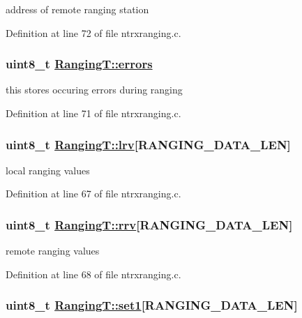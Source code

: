 address of remote ranging station 

Definition at line 72 of file ntrxranging.c.\hypertarget{structRangingT_215921081ad3adb2e4eaf6ee121e1015}{
\subsubsection[errors]{\setlength{\rightskip}{0pt plus 5cm}uint8\_\-t \hyperlink{structRangingT_215921081ad3adb2e4eaf6ee121e1015}{Ranging\-T::errors}}}
\label{structRangingT_215921081ad3adb2e4eaf6ee121e1015}


this stores occuring errors during ranging 

Definition at line 71 of file ntrxranging.c.\hypertarget{structRangingT_2709b7cecea01e61e4a1664b8b639fc3}{
\subsubsection[lrv]{\setlength{\rightskip}{0pt plus 5cm}uint8\_\-t \hyperlink{structRangingT_2709b7cecea01e61e4a1664b8b639fc3}{Ranging\-T::lrv}\mbox{[}RANGING\_\-DATA\_\-LEN\mbox{]}}}
\label{structRangingT_2709b7cecea01e61e4a1664b8b639fc3}


local ranging values 

Definition at line 67 of file ntrxranging.c.\hypertarget{structRangingT_02e77ce88b8c2b7e44b0970a7ae94bd0}{
\subsubsection[rrv]{\setlength{\rightskip}{0pt plus 5cm}uint8\_\-t \hyperlink{structRangingT_02e77ce88b8c2b7e44b0970a7ae94bd0}{Ranging\-T::rrv}\mbox{[}RANGING\_\-DATA\_\-LEN\mbox{]}}}
\label{structRangingT_02e77ce88b8c2b7e44b0970a7ae94bd0}


remote ranging values 

Definition at line 68 of file ntrxranging.c.\hypertarget{structRangingT_2b35c473cc31e5b390bc2c2a92810661}{
\subsubsection[set1]{\setlength{\rightskip}{0pt plus 5cm}uint8\_\-t \hyperlink{structRangingT_2b35c473cc31e5b390bc2c2a92810661}{Ranging\-T::set1}\mbox{[}RANGING\_\-DATA\_\-LEN\mbox{]}}}
\label{structRangingT_2b35c473cc31e5b390bc2c2a92810661}


